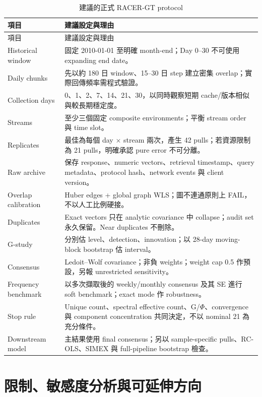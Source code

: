 \documentclass[12pt,a4paper,oneside]{article}
\begin{document}
\begin{longtable}{p{4.8cm}p{9.1cm}}
\caption{建議的正式 RACER-GT protocol}\label{tab:recommended}\\
\toprule
項目 & 建議設定與理由\\
\midrule
\endfirsthead
\toprule
項目 & 建議設定與理由\\
\midrule
\endhead
Historical window & 固定 2010-01-01 至明確 month-end；Day 0--30 不可使用 expanding end date。\\
Daily chunks & 先以約 180 日 window、15--30 日 step 建立密集 overlap；實際回傳頻率需程式驗證。\\
Collection days & 0、1、2、7、14、21、30，以同時觀察短期 cache/版本相似與較長期穩定度。\\
Streams & 至少三個固定 composite environments；平衡 stream order 與 time slot。\\
Replicates & 最佳為每個 day $\times$ stream 兩次，產生 42 pulls；若資源限制為 21 pulls，明確承認 pure error 不可分離。\\
Raw archive & 保存 response、numeric vectors、retrieval timestamp、query metadata、protocol hash、network events 與 client version。\\
Overlap calibration & Huber edges + global graph WLS；圖不連通原則上 FAIL，不以人工比例硬接。\\
Duplicates & Exact vectors 只在 analytic covariance 中 collapse；audit set 永久保留。Near duplicates 不刪除。\\
G-study & 分別估 level、detection、innovation；以 28-day moving-block bootstrap 估 interval。\\
Consensus & Ledoit--Wolf covariance；非負 weights；weight cap 0.5 作預設，另報 unrestricted sensitivity。\\
Frequency benchmark & 以多次擷取後的 weekly/monthly consensus 及其 SE 進行 soft benchmark；exact mode 作 robustness。\\
Stop rule & Unique count、spectral effective count、G/$\Phi$、convergence 與 component concentration 共同決定，不以 nominal 21 為充分條件。\\
Downstream model & 主結果使用 final consensus；另以 sample-specific pulls、RC-OLS、SIMEX 與 full-pipeline bootstrap 檢查。\\
\bottomrule
\end{longtable}

\section{限制、敏感度分析與可延伸方向}
\end{document}
